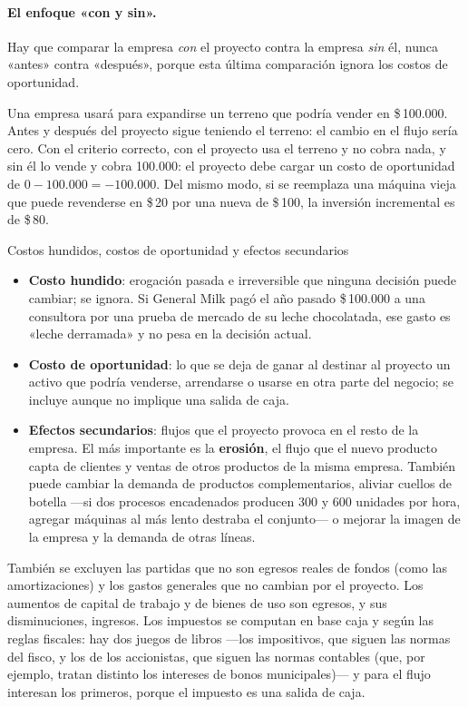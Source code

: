 \paragraph{El enfoque «con y sin».} Hay que comparar la empresa \emph{con} el proyecto contra la empresa \emph{sin} él, nunca «antes» contra «después», porque esta última comparación ignora los costos de oportunidad.

\begin{ejemplo}
Una empresa usará para expandirse un terreno que podría vender en \$\,100.000. Antes y después del proyecto sigue teniendo el terreno: el cambio en el flujo sería cero. Con el criterio correcto, con el proyecto usa el terreno y no cobra nada, y sin él lo vende y cobra 100.000: el proyecto debe cargar un costo de oportunidad de $0 - 100.000 = -100.000$. Del mismo modo, si se reemplaza una máquina vieja que puede revenderse en \$\,20 por una nueva de \$\,100, la inversión incremental es de \$\,80.
\end{ejemplo}

\begin{definicion}{Costos hundidos, costos de oportunidad y efectos secundarios}
\begin{itemize}
\item \textbf{Costo hundido}: erogación pasada e irreversible que ninguna decisión puede cambiar; se ignora. Si General Milk pagó el año pasado \$\,100.000 a una consultora por una prueba de mercado de su leche chocolatada, ese gasto es «leche derramada» y no pesa en la decisión actual.
\item \textbf{Costo de oportunidad}: lo que se deja de ganar al destinar al proyecto un activo que podría venderse, arrendarse o usarse en otra parte del negocio; se incluye aunque no implique una salida de caja.
\item \textbf{Efectos secundarios}: flujos que el proyecto provoca en el resto de la empresa. El más importante es la \textbf{erosión}, el flujo que el nuevo producto capta de clientes y ventas de otros productos de la misma empresa. También puede cambiar la demanda de productos complementarios, aliviar cuellos de botella —si dos procesos encadenados producen 300 y 600 unidades por hora, agregar máquinas al más lento destraba el conjunto— o mejorar la imagen de la empresa y la demanda de otras líneas.
\end{itemize}
\end{definicion}

También se excluyen las partidas que no son egresos reales de fondos (como las amortizaciones) y los gastos generales que no cambian por el proyecto. Los aumentos de capital de trabajo y de bienes de uso son egresos, y sus disminuciones, ingresos. Los impuestos se computan en base caja y según las reglas fiscales: hay dos juegos de libros —los impositivos, que siguen las normas del fisco, y los de los accionistas, que siguen las normas contables (que, por ejemplo, tratan distinto los intereses de bonos municipales)— y para el flujo interesan los primeros, porque el impuesto es una salida de caja.

